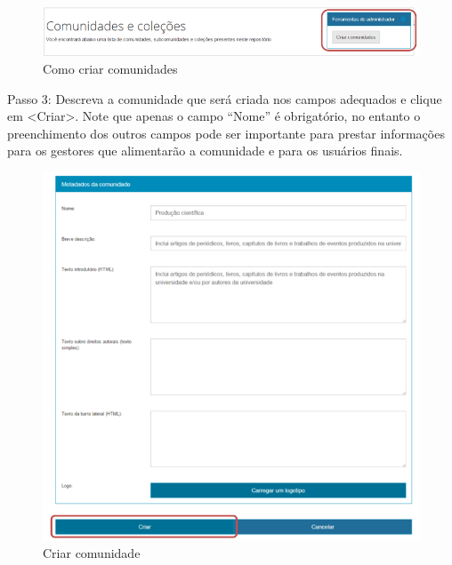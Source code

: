 \documentclass[12pt,hidelinks]{article}
\begin{document}
     \begin{figure}[!htp]
                \centering
                \includegraphics[scale=0.8]{figura/Figura11.png}
                \caption{Como criar comunidades}
            \label{Rotulo}
        \end{figure}
        
    Passo 3: Descreva a comunidade que será criada nos campos adequados e clique em <Criar>. Note que apenas o campo “Nome” é obrigatório, no entanto o preenchimento dos outros campos pode ser importante para prestar informações para os gestores que alimentarão a comunidade e para os usuários finais.
    
    \begin{figure}[!htp]
                \centering
                \includegraphics[scale=0.9]{figura/Figura12.png}
                \caption{Criar comunidade}
            \label{Rotulo}
        \end{figure}
\end{document}
